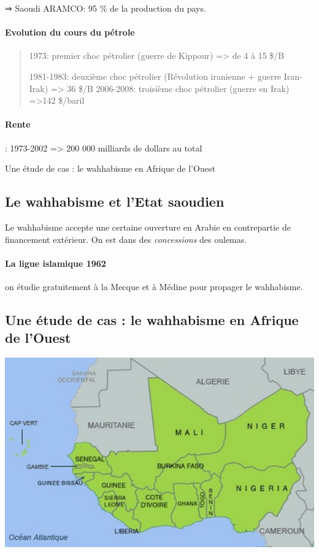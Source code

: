 ⇒ Saoudi ARAMCO: 95 \% de la production du pays.

 
\paragraph{Evolution du cours du
pétrole} 

\begin{quote}
1973: premier choc pétrolier (guerre de Kippour) =\textgreater{} de 4 à
15 \$/B

1981-1983: deuxième choc pétrolier (Révolution iranienne + guerre
Iran-Irak) =\textgreater{} 36 \$/B 2006-2008: troisième choc pétrolier
(guerre en Irak) =\textgreater142 \$/baril
\end{quote}

\paragraph{{Rente}}: 1973-2002 =\textgreater{} 200 000 milliards
de dollars au total
 
    Une étude de cas : le wahhabisme en Afrique de l'Ouest
    
\subsection{Le wahhabisme et l'Etat saoudien}

Le wahhabisme accepte une certaine ouverture en Arabie en contrepartie de financement extérieur. On est dans des \textit{concessions} des oulemas. 

\paragraph{La ligue islamique 1962} on étudie gratuitement à la Mecque et à Médine pour propager le wahhabisme.

 
\subsection{Une étude de cas : le wahhabisme en Afrique de l’Ouest}
 \includegraphics[width=\textwidth]{CourantsIslamContemporain/ImagesCourantsIslamContemporain/WahhabismeAfricain.jpg}

